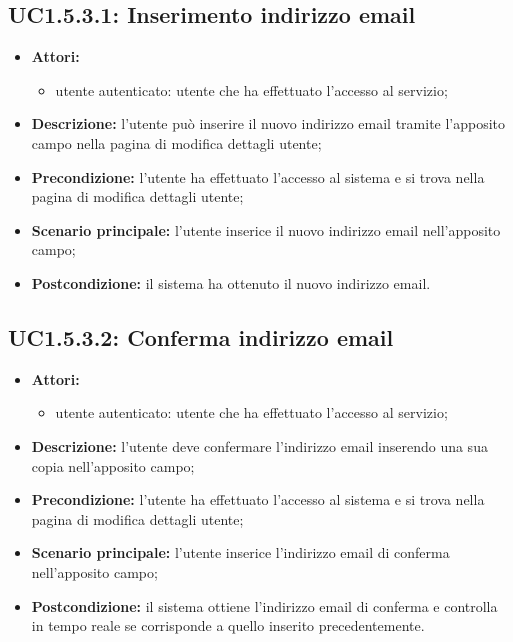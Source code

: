\subsection{UC1.5.3.1: Inserimento indirizzo email}
\begin{itemize}
	\item \textbf{Attori:}
	\begin{itemize}
		\item utente autenticato: utente che ha effettuato l'accesso al servizio;
	\end{itemize}
	\item \textbf{Descrizione:} l'utente può inserire il nuovo indirizzo email tramite l'apposito campo nella pagina di modifica dettagli utente;
	\item \textbf{Precondizione:} l'utente ha effettuato l'accesso al sistema e si trova nella pagina di modifica dettagli utente;
	\item \textbf{Scenario principale:} l'utente inserice il nuovo indirizzo email nell'apposito campo;
	\item \textbf{Postcondizione:} il sistema ha ottenuto il nuovo indirizzo email.
\end{itemize}

\subsection{UC1.5.3.2: Conferma indirizzo email}
\begin{itemize}
	\item \textbf{Attori:}
	\begin{itemize}
		\item utente autenticato: utente che ha effettuato l'accesso al servizio;
	\end{itemize}
	\item \textbf{Descrizione:} l'utente deve confermare l'indirizzo email inserendo una sua copia nell'apposito campo;
	\item \textbf{Precondizione:} l'utente ha effettuato l'accesso al sistema e si trova nella pagina di modifica dettagli utente;
	\item \textbf{Scenario principale:} l'utente inserice l'indirizzo email di conferma nell'apposito campo;
	\item \textbf{Postcondizione:} il sistema ottiene l'indirizzo email di conferma e controlla in tempo reale se corrisponde a quello inserito precedentemente.
\end{itemize}

